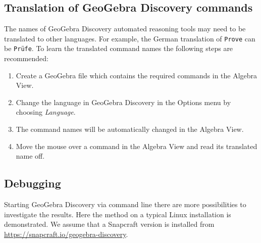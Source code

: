 \documentclass{article}
\begin{document}
\subsection{Translation of GeoGebra Discovery commands}

The names of GeoGebra Discovery automated reasoning tools may need to be translated to other languages. For example, the German translation of \texttt{Prove} can be \texttt{Pr\"ufe}.
To learn the translated command names the following steps are recommended:

\begin{enumerate}
\item Create a GeoGebra file which contains the required commands in the Algebra View.
\item Change the language in GeoGebra Discovery in the Options menu by choosing \textit{Language}.
\item The command names will be automatically changed in the Algebra View.
\item Move the mouse over a command in the Algebra View and read its translated name off.
\end{enumerate}

\subsection{Debugging}
Starting GeoGebra Discovery via command line there are more possibilities to investigate the results. Here the method on a typical Linux installation is demonstrated. We assume that a Snapcraft version is installed from \url{https://snapcraft.io/geogebra-discovery}.
\end{document}
